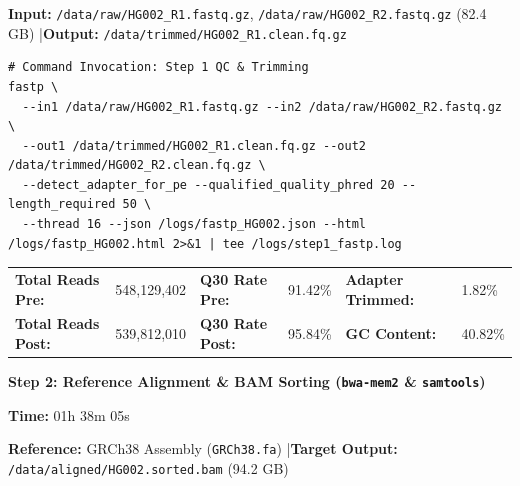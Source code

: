 \documentclass[10pt,a4paper]{article}
\newcommand{\badge}[2]{%
  \tcbox[on line, arc=3pt, colback=#1, colframe=#1, boxrule=0pt, top=1.5pt, bottom=1.5pt, left=5pt, right=5pt]{%
    \scriptsize\bfseries #2%
  }%
}
\begin{document}
\vspace{2pt}
{\scriptsize\textbf{Input:} \texttt{/data/raw/HG002\_R1.fastq.gz}, \texttt{/data/raw/HG002\_R2.fastq.gz} (82.4 GB) \quad|\quad \textbf{Output:} \texttt{/data/trimmed/HG002\_R1.clean.fq.gz}}

\vspace{3pt}

\begin{tcolorbox}[codebox]
\begin{lstlisting}[style=bashstyle]
# Command Invocation: Step 1 QC & Trimming
fastp \
  --in1 /data/raw/HG002_R1.fastq.gz --in2 /data/raw/HG002_R2.fastq.gz \
  --out1 /data/trimmed/HG002_R1.clean.fq.gz --out2 /data/trimmed/HG002_R2.clean.fq.gz \
  --detect_adapter_for_pe --qualified_quality_phred 20 --length_required 50 \
  --thread 16 --json /logs/fastp_HG002.json --html /logs/fastp_HG002.html 2>&1 | tee /logs/step1_fastp.log
\end{lstlisting}
\end{tcolorbox}

\begin{tcolorbox}[cardstyle, title={\scriptsize\color{NavyDark}\bfseries Step 1 Execution Summary \& Quality Metrics}]
  \scriptsize
  \begin{tabularx}{\textwidth}{@{} >{\bfseries}l X >{\bfseries}l X >{\bfseries}l X @{}}
    Total Reads Pre: & 548,129,402 & Q30 Rate Pre: & 91.42\% & Adapter Trimmed: & 1.82\% \\
    Total Reads Post: & 539,812,010 & Q30 Rate Post: & 95.84\% & GC Content: & 40.82\% \\
  \end{tabularx}
\end{tcolorbox}

\vspace{8pt}

\noindent
\begin{minipage}[t]{0.70\textwidth}
  \normalsize\bfseries\color{NavyDark} Step 2: Reference Alignment \& BAM Sorting (\texttt{bwa-mem2} \& \texttt{samtools})
\end{minipage}%
\hfill
\begin{minipage}[t]{0.28\textwidth}
  \raggedleft
  \badge{StatusGreenBg}{\color{StatusGreen}\faCheck~\,PASS} \quad
  \scriptsize\textbf{Time:} 01h 38m 05s
\end{minipage}

\vspace{2pt}
{\scriptsize\textbf{Reference:} GRCh38 Assembly (\texttt{GRCh38.fa}) \quad|\quad \textbf{Target Output:} \texttt{/data/aligned/HG002.sorted.bam} (94.2 GB)}
\end{document}
